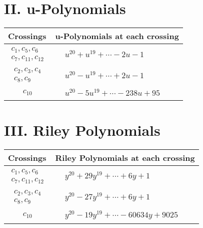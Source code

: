 \documentclass[1p]{elsarticle_modified}
\theoremstyle{definition}
\begin{document}
\newpage\renewcommand{\arraystretch}{1}
\centering \section*{ II. u-Polynomials}
\begin{tabular}{m{50pt}|m{274pt}}
Crossings & \hspace{64pt}u-Polynomials at each crossing \\
\hline $$\begin{aligned}c_{1},c_{5},c_{6}\\c_{7},c_{11},c_{12}\end{aligned}$$&$\begin{aligned}
&u^{20}+u^{19}+\cdots-2 u-1
\end{aligned}$\\
\hline $$\begin{aligned}c_{2},c_{3},c_{4}\\c_{8},c_{9}\end{aligned}$$&$\begin{aligned}
&u^{20}- u^{19}+\cdots+2 u-1
\end{aligned}$\\
\hline $$\begin{aligned}c_{10}\end{aligned}$$&$\begin{aligned}
&u^{20}-5 u^{19}+\cdots-238 u+95
\end{aligned}$\\
\hline
\end{tabular}\newpage\renewcommand{\arraystretch}{1}
\centering \section*{ III. Riley Polynomials}
\begin{tabular}{m{50pt}|m{274pt}}
Crossings & \hspace{64pt}Riley Polynomials at each crossing \\
\hline $$\begin{aligned}c_{1},c_{5},c_{6}\\c_{7},c_{11},c_{12}\end{aligned}$$&$\begin{aligned}
&y^{20}+29 y^{19}+\cdots+6 y+1
\end{aligned}$\\
\hline $$\begin{aligned}c_{2},c_{3},c_{4}\\c_{8},c_{9}\end{aligned}$$&$\begin{aligned}
&y^{20}-27 y^{19}+\cdots+6 y+1
\end{aligned}$\\
\hline $$\begin{aligned}c_{10}\end{aligned}$$&$\begin{aligned}
&y^{20}-19 y^{19}+\cdots-60634 y+9025
\end{aligned}$\\
\hline
\end{tabular}
\vskip 2pc
\end{document}
